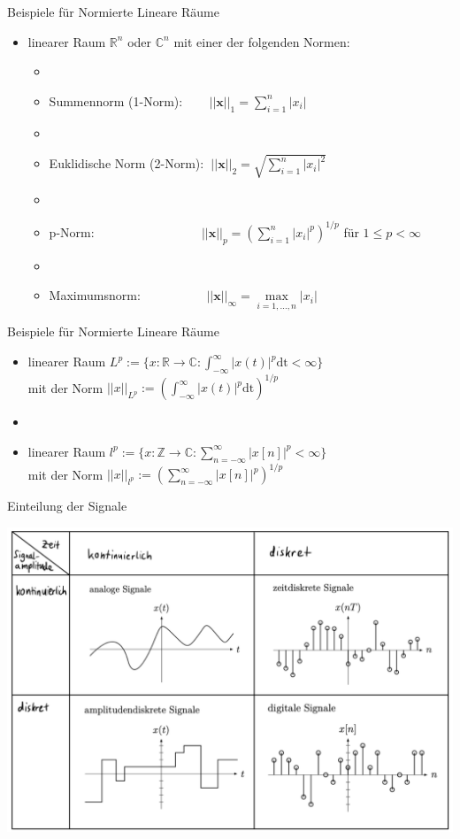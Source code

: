 \documentclass[14pt, aspectratio=169, handout]{beamer}
\begin{document}
\begin{frame}{Beispiele für Normierte Lineare Räume}
    \begin{itemize}
        \item linearer Raum $\mathbb{R}^n$ oder $\mathbb{C}^n$ mit einer der folgenden Normen: \begin{itemize}
        \item[] 
        \item[] Summennorm (1-Norm): $\hspace{22pt}||\mathbf{x}||_1 = \sum_{i=1}^n |x_i|$
        \item[] 
        \item[] Euklidische Norm (2-Norm): $\hspace{3pt}||\mathbf{x}||_2 = \sqrt{\sum_{i=1}^n |x_i|^2}$
        \item[] 
        \item[] p-Norm: $\hspace{100pt}||\mathbf{x}||_p = \left(\sum_{i=1}^n |x_i|^p\right)^{1/p}$ für $1\leq p < \infty$
        \item[] 
        \item[] Maximumsnorm: $\hspace{60pt}||\mathbf{x}||_\infty = \underset{i=1,\dots,n}{\max}|x_i|$
        \end{itemize}
    \end{itemize}
\end{frame}

\begin{frame}{Beispiele für Normierte Lineare Räume}
    \begin{itemize}
        \item linearer Raum $L^p := \{ x:\mathbb{R}\to \mathbb{C} : \int_{-\infty}^\infty |x(t)|^p \text{dt} < \infty \} $ \\mit der Norm $||x||_{L^p} := \left( \int_{-\infty}^\infty |x(t)|^p \text{dt}\right)^{1/p}$
        \item[] 
        \item linearer Raum $l^p :=\{ x:\mathbb{Z}\to \mathbb{C} : \sum_{n=-\infty}^\infty |x[n]|^p < \infty \} $ \\mit der Norm $||x||_{l^p} := \left( \sum_{n=-\infty}^\infty |x[n]|^p \right)^{1/p}$
    \end{itemize}
\end{frame}

\begin{frame}{Einteilung der Signale}
    \begin{center}
            \includegraphics[width=0.7\linewidth]{figures/Signale.jpg}
    \end{center}
\end{frame}
\end{document}
